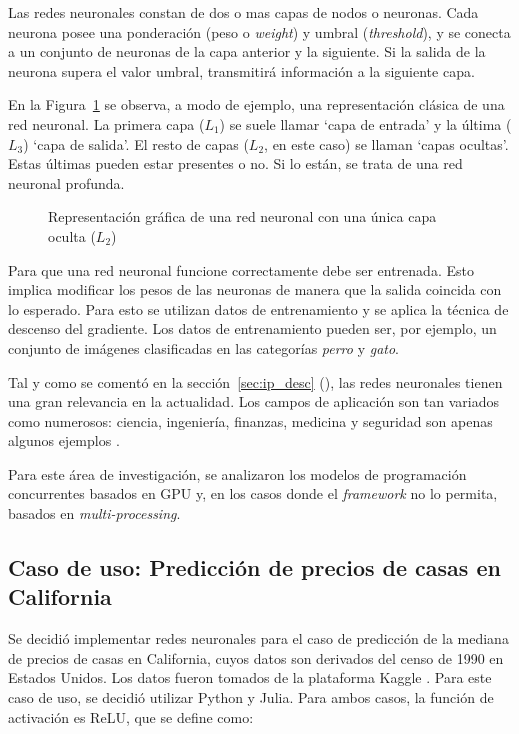 \documentclass[11pt]{article}
\let\Oldsubsection\subsection
\renewcommand{\subsection}{\FloatBarrier\Oldsubsection}
\newcommand{\english}[1]{\textit{#1}}
\newcommand{\technical}[1]{\textit{#1}}
\begin{document}
Las redes neuronales constan de dos o mas capas de nodos o neuronas. Cada neurona posee una ponderación (peso o \english{weight}) y umbral (\english{threshold}), y se conecta a un conjunto de neuronas de la capa anterior y la siguiente. Si la salida de la neurona supera el valor umbral, transmitirá información a la siguiente capa.

En la Figura~\ref{fig:nn:diagram} se observa, a modo de ejemplo, una representación clásica de una red neuronal. La primera capa ($L_1$) se suele llamar `capa de entrada' y la última ($L_3$) `capa de salida'. El resto de capas ($L_2$, en este caso) se llaman `capas ocultas'. Estas últimas pueden estar presentes o no. Si lo están, se trata de una red neuronal profunda.

 \begin{figure}[h]
    \centering
    
    \caption{Representación gráfica de una red neuronal con una única capa oculta ($L_2$)}
    \label{fig:nn:diagram}
\end{figure}

Para que una red neuronal funcione correctamente debe ser entrenada. Esto implica modificar los pesos de las neuronas de manera que la salida coincida con lo esperado. Para esto se utilizan datos de entrenamiento y se aplica la técnica de descenso del gradiente. Los datos de entrenamiento pueden ser, por ejemplo, un conjunto de imágenes clasificadas en las categorías \technical{perro} y \technical{gato}.

Tal y como se comentó en la sección~\ref{sec:ip_desc} (), las redes neuronales tienen una gran relevancia en la actualidad. Los campos de aplicación son tan variados como numerosos: ciencia, ingeniería, finanzas, medicina y seguridad son apenas algunos ejemplos \cite{nn:survey}.

Para este área de investigación, se analizaron los modelos de programación concurrentes basados en GPU y, en los casos donde el \english{framework} no lo permita, basados en \english{multi-processing}. 

\subsection{Caso de uso: Predicción de precios de casas en California}

Se decidió implementar redes neuronales para el caso de predicción de la mediana de precios de casas en California, cuyos datos son derivados del censo de 1990 en Estados Unidos. Los datos fueron tomados de la plataforma Kaggle \cite{com:kaggle}. Para este caso de uso, se decidió utilizar Python y Julia. Para ambos casos, la función de activación es ReLU, que se define como:
\end{document}
